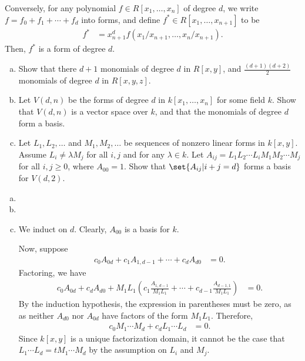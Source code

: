 \documentclass[10pt]{mypackage}
\begin{document}
Conversely, for any polynomial $f\in R\left[ x_1,\dots,x_n \right]$ of degree $d$, we write $f = f_0 + f_1 + \cdots + f_d$ into forms, and define $f^{\ast}\in R\left[ x_1,\dots,x_{n+1} \right]$ to be
\begin{align*}
  f^{\ast} &= x^{d}_{n+1}f\left( x_1/x_{n+1},\dots,x_n/x_{n+1} \right).
\end{align*}
Then, $f^{\ast}$ is a form of degree $d$.
\begin{exercise}[Exercise 2.35]\hfill
  \begin{enumerate}[(a)]
    \item Show that there $d + 1$ monomials of degree $d$ in $R\left[ x,y \right]$, and $\frac{\left( d+1 \right)\left( d+2 \right)}{2}$ monomials of degree $d$ in $R\left[ x,y,z \right]$.
    \item Let $V\left( d,n \right)$ be the forms of degree $d$ in $k\left[ x_1,\dots,x_n \right]$ for some field $k$. Show that $V\left( d,n \right)$ is a vector space over $k$, and that the monomials of degree $d$ form a basis.
    \item Let $L_1,L_2,\dots$ and $M_1,M_2,\dots$ be sequences of nonzero linear forms in $k\left[ x,y \right]$. Assume $L_i\neq \lambda M_j$ for all $i,j$ and for any $\lambda\in k$. Let $A_{ij} = L_1L_2\cdots L_iM_1M_2\cdots M_j$ for all $i,j\geq 0$, where $A_{00} = 1$. Show that $\set{A_{ij} | i+j=d}$ forms a basis for $V\left( d,2 \right)$.
  \end{enumerate}
\end{exercise}
\begin{solution}\hfill
  \begin{enumerate}[(a)]
    \item 
    \item 
    \item We induct on $d$. Clearly, $A_{00}$ is a basis for $k$.\newline
      
      Now, suppose
      \begin{align*}
        c_0  A_{0d} + c_1A_{1,d-1} + \cdots + c_dA_{d0} &= 0.
      \end{align*}
      Factoring, we have
      \begin{align*}
        c_0A_{0d} + c_dA_{d0} + M_1L_1\left( c_1\frac{A_{1,d-1}}{M_1L_1} + \cdots + c_{d-1}\frac{A_{d-1,1}}{M_1L_1} \right) &= 0.
      \end{align*}
      By the induction hypothesis, the expression in parentheses must be zero, as as neither $A_{d0}$ nor $A_{0d}$ have factors of the form $M_1L_1$. Therefore,
      \begin{align*}
        c_0M_1\cdots M_d + c_dL_1\cdots L_d &= 0.
      \end{align*}
      Since $k\left[ x,y \right]$ is a unique factorization domain, it cannot be the case that $L_1\cdots L_d = t M_1\cdots M_d$ by the assumption on $L_i$ and $M_j$.
  \end{enumerate}
\end{solution}
\end{document}
